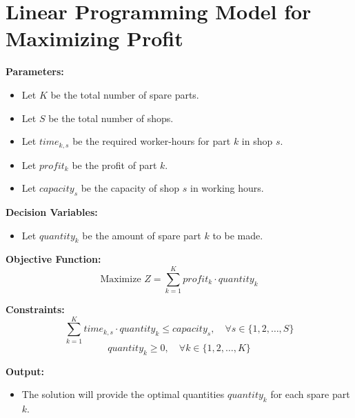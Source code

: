 \documentclass{article}
\begin{document}
\section*{Linear Programming Model for Maximizing Profit}

\textbf{Parameters:}
\begin{itemize}
    \item Let \( K \) be the total number of spare parts.
    \item Let \( S \) be the total number of shops.
    \item Let \( time_{k,s} \) be the required worker-hours for part \( k \) in shop \( s \).
    \item Let \( profit_{k} \) be the profit of part \( k \).
    \item Let \( capacity_{s} \) be the capacity of shop \( s \) in working hours.
\end{itemize}

\textbf{Decision Variables:}
\begin{itemize}
    \item Let \( quantity_{k} \) be the amount of spare part \( k \) to be made.
\end{itemize}

\textbf{Objective Function:}
\[
\text{Maximize } Z = \sum_{k=1}^{K} profit_{k} \cdot quantity_{k}
\]

\textbf{Constraints:}
\[
\sum_{k=1}^{K} time_{k,s} \cdot quantity_{k} \leq capacity_{s}, \quad \forall s \in \{1, 2, \ldots, S\}
\]
\[
quantity_{k} \geq 0, \quad \forall k \in \{1, 2, \ldots, K\}
\]

\textbf{Output:}
\begin{itemize}
    \item The solution will provide the optimal quantities \( quantity_{k} \) for each spare part \( k \).
\end{itemize}
\end{document}
